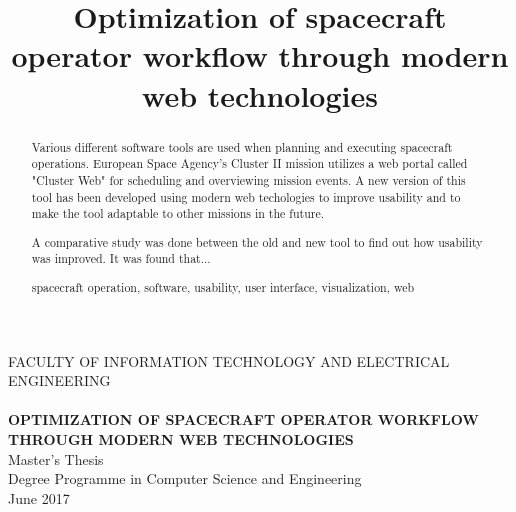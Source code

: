 \documentclass[a4paper, 12pt,titlepage]{dithesis}
\title{Optimization of spacecraft operator workflow through modern web technologies}
\begin{document}
\begin{titlepage}
	{\sffamily\fontsize{9}{1pt}\selectfont FACULTY OF INFORMATION TECHNOLOGY AND ELECTRICAL ENGINEERING\\}
	\vspace{65 mm}
	{\textbf{\fontsize{16}{19pt}\selectfont \getfirstname\ \getlastname }\\}
	\vspace{15 mm}
	{\textbf{\fontsize{18}{22pt}\selectfont OPTIMIZATION OF SPACECRAFT OPERATOR WORKFLOW THROUGH MODERN WEB TECHNOLOGIES\\}}
	\vspace{53 mm}
	{\fontsize{14}{17}\selectfont Master's Thesis \\Degree Programme in Computer Science and Engineering \\ June 2017\\}
\end{titlepage}


\begin{abstract}
Various different software tools are used when planning and executing spacecraft operations. European Space Agency's Cluster II mission utilizes a web portal called "Cluster Web" for scheduling and overviewing mission events. A new version of this tool has been developed using modern web techologies to improve usability and to make the tool adaptable to other missions in the future. 

A comparative study was done between the old and new tool to find out how usability was improved. It was found that...

\keywords spacecraft operation, software, usability, user interface, visualization, web

\end{abstract}
\end{document}
